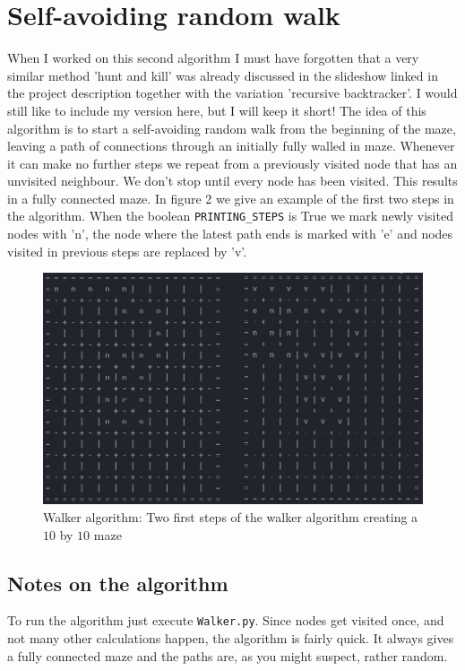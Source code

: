 \documentclass[10pt, a4paper, twoside]{amsart}
\newcommand{\1}{\mathbbm{1}}
\begin{document}
\section{Self-avoiding random walk}
When I worked on this second algorithm I must have forgotten that a very similar method 'hunt and kill' was already discussed in the slideshow linked in the project description together with the variation 'recursive backtracker'. I would still like to include my version here, but I will keep it short!
The idea of this algorithm is to start a self-avoiding random walk from the beginning of the maze, leaving a path of connections through an initially fully walled in maze. Whenever it can make no further steps we repeat from a previously visited node that has an unvisited neighbour. We don't stop until every node has been visited. This results in a fully connected maze. In figure 2 we give an example of the first two steps in the algorithm. When the boolean \verb+PRINTING_STEPS+ is True we mark newly visited nodes with 'n', the node where the latest path ends is marked with 'e' and nodes visited in previous steps are replaced by 'v'.

\begin{figure}
\centering
        \includegraphics[totalheight=8cm]{beginwalker}
    \caption{Walker algorithm: Two first steps of the walker algorithm creating a $10$ by $10$ maze}
\end{figure}


\subsection*{Notes on the algorithm}
To run the algorithm just execute \verb+Walker.py+. Since nodes get visited once, and not many other calculations happen, the algorithm is fairly quick. It always gives a fully connected maze and the paths are, as you might suspect, rather random.\\
\end{document}
